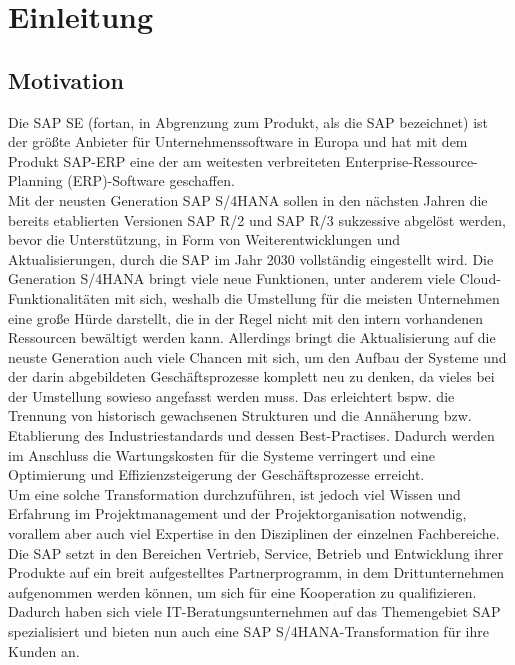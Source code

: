 \section{Einleitung}
\subsection{Motivation}
Die SAP SE (fortan, in Abgrenzung zum Produkt, als \glqq{}die\grqq{} SAP bezeichnet) ist der größte Anbieter für Unternehmenssoftware in Europa und hat mit dem Produkt SAP-ERP eine der am weitesten verbreiteten Enterprise-Ressource-Planning (ERP)-Software geschaffen. \\Mit der neusten Generation SAP S/4HANA sollen in den nächsten Jahren die bereits etablierten Versionen SAP R/2 und SAP R/3 sukzessive abgelöst werden, bevor die Unterstützung, in Form von Weiterentwicklungen und Aktualisierungen, durch die SAP im Jahr 2030 vollständig eingestellt wird. Die Generation S/4HANA bringt viele neue Funktionen, unter anderem viele Cloud-Funktionalitäten mit sich, weshalb die Umstellung für die meisten Unternehmen eine große Hürde darstellt, die in der Regel nicht mit den intern vorhandenen Ressourcen bewältigt werden kann. Allerdings bringt die Aktualisierung auf die neuste Generation auch viele Chancen mit sich, um den Aufbau der Systeme und der darin abgebildeten Geschäftsprozesse komplett neu zu denken, 
da vieles bei der Umstellung sowieso angefasst werden muss. Das erleichtert bspw. die Trennung von historisch gewachsenen Strukturen und die Annäherung bzw. Etablierung des Industriestandards und dessen Best-Practises. Dadurch werden im Anschluss die Wartungskosten für die Systeme verringert und eine Optimierung und Effizienzsteigerung der Geschäftsprozesse erreicht.\\ Um eine solche Transformation durchzuführen, ist jedoch viel Wissen und Erfahrung im Projektmanagement und der Projektorganisation notwendig, vorallem aber auch viel Expertise in den Disziplinen der einzelnen Fachbereiche.
Die SAP setzt in den Bereichen Vertrieb, Service, Betrieb und  Entwicklung ihrer Produkte auf ein breit aufgestelltes Partnerprogramm, in dem Drittunternehmen aufgenommen werden können, um sich für eine Kooperation zu qualifizieren. Dadurch haben sich viele IT-Beratungsunternehmen auf das Themengebiet SAP spezialisiert und bieten nun auch eine SAP S/4HANA-Transformation für ihre Kunden an.

